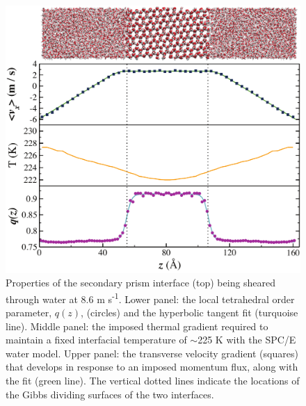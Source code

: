 \begin{figure}
\includegraphics[width=\linewidth]{Figures/SecPrismComicStrip}
\caption{\label{fig:spComic} Properties of the secondary prism
  interface (top) being sheared through water at 8.6 m
  s\textsuperscript{-1}. Lower panel: the local tetrahedral order
  parameter, $q(z)$, (circles) and the hyperbolic tangent fit
  (turquoise line).  Middle panel: the imposed thermal gradient
  required to maintain a fixed interfacial temperature of $\sim$225 K
  with the SPC/E water model. Upper panel: the transverse velocity
  gradient (squares) that develops in response to an imposed momentum
  flux, along with the fit (green line). The vertical dotted lines
  indicate the locations of the Gibbs dividing surfaces of the two
  interfaces.}
\end{figure}



